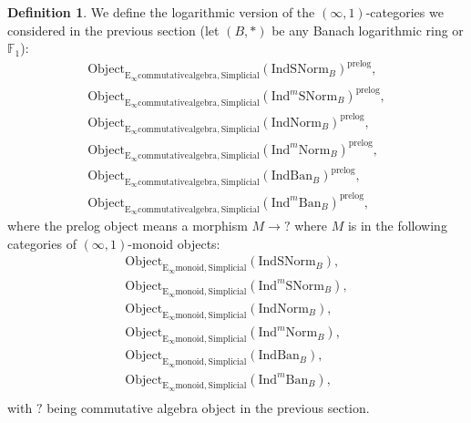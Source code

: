\documentclass[11pt]{book}
\theoremstyle{definition}
\newtheorem{definition}[theorem]{Definition}
\numberwithin{equation}{section}
\begin{document}
\begin{definition}
We define the logarithmic version of the $(\infty,1)$-categories we considered in the previous section (let $(B,*)$ be any Banach logarithmic ring or $\mathbb{F}_1$):
\begin{align}
\mathrm{Object}_{\mathrm{E}_\infty\mathrm{commutativealgebra},\mathrm{Simplicial}}(\mathrm{IndSNorm}_B)^{\text{prelog}},\\
\mathrm{Object}_{\mathrm{E}_\infty\mathrm{commutativealgebra},\mathrm{Simplicial}}(\mathrm{Ind}^m\mathrm{SNorm}_B)^{\text{prelog}},\\
\mathrm{Object}_{\mathrm{E}_\infty\mathrm{commutativealgebra},\mathrm{Simplicial}}(\mathrm{IndNorm}_B)^{\text{prelog}},\\
\mathrm{Object}_{\mathrm{E}_\infty\mathrm{commutativealgebra},\mathrm{Simplicial}}(\mathrm{Ind}^m\mathrm{Norm}_B)^{\text{prelog}},\\
\mathrm{Object}_{\mathrm{E}_\infty\mathrm{commutativealgebra},\mathrm{Simplicial}}(\mathrm{IndBan}_B)^{\text{prelog}},\\
\mathrm{Object}_{\mathrm{E}_\infty\mathrm{commutativealgebra},\mathrm{Simplicial}}(\mathrm{Ind}^m\mathrm{Ban}_B)^{\text{prelog}},
\end{align}
where the prelog object means a morphism $M\rightarrow ?$ where	$M$ is
in the following categories of $(\infty,1)$-monoid objects:
\begin{align}
\mathrm{Object}_{\mathrm{E}_\infty\mathrm{monoid},\mathrm{Simplicial}}(\mathrm{IndSNorm}_B),\\
\mathrm{Object}_{\mathrm{E}_\infty\mathrm{monoid},\mathrm{Simplicial}}(\mathrm{Ind}^m\mathrm{SNorm}_B),\\
\mathrm{Object}_{\mathrm{E}_\infty\mathrm{monoid},\mathrm{Simplicial}}(\mathrm{IndNorm}_B),\\
\mathrm{Object}_{\mathrm{E}_\infty\mathrm{monoid},\mathrm{Simplicial}}(\mathrm{Ind}^m\mathrm{Norm}_B),\\
\mathrm{Object}_{\mathrm{E}_\infty\mathrm{monoid},\mathrm{Simplicial}}(\mathrm{IndBan}_B),\\
\mathrm{Object}_{\mathrm{E}_\infty\mathrm{monoid},\mathrm{Simplicial}}(\mathrm{Ind}^m\mathrm{Ban}_B),\\
\end{align}
with $?$ being commutative algebra object in the previous section.
\end{definition}
\end{document}
